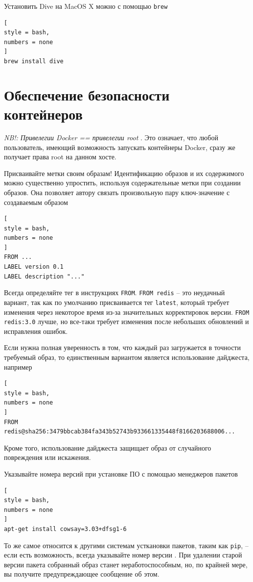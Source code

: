 \documentclass[%
	11pt,
	a4paper,
	utf8,
		]{article}
\begin{document}
Установить Dive на MacOS X можно с помощью \texttt{brew}
\begin{lstlisting}[
style = bash,
numbers = none	
]
brew install dive
\end{lstlisting}

\section{Обеспечение безопасности контейнеров}

{\color{red}\itshape NB!: Привелегии Docker == привелегии root} \cite[]{mouat:docker-2017}. Это означает, что любой пользователь, имеющий возможность запускать контейнеры Docker, сразу же получает права root на данном хосте.

Присваивайте метки своим образам! Идентификацию образов и их содержимого можно существенно упростить, используя содержательные метки при создании образов. Она позволяет автору связать произвольную пару ключ-значение с создаваемым образом
\begin{lstlisting}[
style = bash,
numbers = none
]
FROM ...
LABEL version 0.1
LABEL description "..."
\end{lstlisting}

Всегда определяйте тег в инструкциях \verb|FROM|. \verb|FROM redis| -- это неудачный вариант, так как по умолчанию присваивается тег \verb|latest|, который требует изменения через некоторое время из-за значительных корректировок версии. \verb|FROM redis:3.0| лучше, но все-таки требует изменения после небольших обновлений и исправления ошибок.

Если нужна полная уверенность в том, что каждый раз загружается в точности требуемый образ, то единственным вариантом является использование дайджеста, например \cite[]{mouat:docker-2017}
\begin{lstlisting}[
style = bash,
numbers = none
]
FROM redis@sha256:3479bbcab384fa343b52743b933661335448f8166203688006...
\end{lstlisting}

Кроме того, использование дайджеста защищает образ от случайного повреждения или искажения.

Указывайте номера версий при установке ПО с помощью менеджеров пакетов
\begin{lstlisting}[
style = bash,
numbers = none
]
apt-get install cowsay=3.03+dfsg1-6
\end{lstlisting}

То же самое относится к другими системам усткановки пакетов, таким как \verb|pip|, -- если есть возможность, всегда указывайте номер версии \cite[]{mouat:docker-2017}. При удалении старой версии пакета собранный образ станет неработоспособным, но, по крайней мере, вы получите предупреждающее сообщение об этом.
\end{document}
